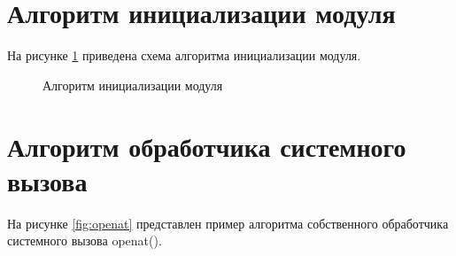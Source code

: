 \section{Алгоритм инициализации модуля}

На рисунке \ref{fig:init} приведена схема алгоритма инициализации модуля.

\begin{figure}[ph!]
	\caption{Алгоритм инициализации модуля}
	\label{fig:init}
\end{figure}

\section{Алгоритм обработчика системного вызова}

На рисунке \ref{fig:openat} представлен пример алгоритма собственного обработчика системного вызова openat().

